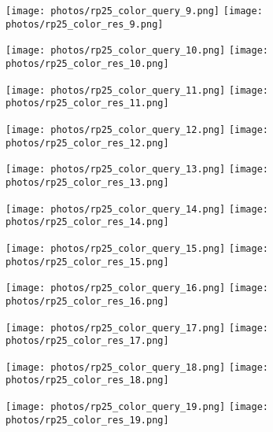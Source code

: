 \documentclass{article}
\begin{document}
\begin{figure}[!ht]
\centering
\texttt{[image: photos/rp25\_color\_query\_9.png]}
\texttt{[image: photos/rp25\_color\_res\_9.png]}
\end{figure}

\begin{figure}[!ht]
\centering
\texttt{[image: photos/rp25\_color\_query\_10.png]}
\texttt{[image: photos/rp25\_color\_res\_10.png]}
\end{figure}

\begin{figure}[!ht]
\centering
\texttt{[image: photos/rp25\_color\_query\_11.png]}
\texttt{[image: photos/rp25\_color\_res\_11.png]}
\end{figure}

\begin{figure}[!ht]
\centering
\texttt{[image: photos/rp25\_color\_query\_12.png]}
\texttt{[image: photos/rp25\_color\_res\_12.png]}
\end{figure}

\begin{figure}[!ht]
\centering
\texttt{[image: photos/rp25\_color\_query\_13.png]}
\texttt{[image: photos/rp25\_color\_res\_13.png]}
\end{figure}

\begin{figure}[!ht]
\centering
\texttt{[image: photos/rp25\_color\_query\_14.png]}
\texttt{[image: photos/rp25\_color\_res\_14.png]}
\end{figure}

\begin{figure}[!ht]
\centering
\texttt{[image: photos/rp25\_color\_query\_15.png]}
\texttt{[image: photos/rp25\_color\_res\_15.png]}
\end{figure}

\begin{figure}[!ht]
\centering
\texttt{[image: photos/rp25\_color\_query\_16.png]}
\texttt{[image: photos/rp25\_color\_res\_16.png]}
\end{figure}

\begin{figure}[!ht]
\centering
\texttt{[image: photos/rp25\_color\_query\_17.png]}
\texttt{[image: photos/rp25\_color\_res\_17.png]}
\end{figure}

\begin{figure}[!ht]
\centering
\texttt{[image: photos/rp25\_color\_query\_18.png]}
\texttt{[image: photos/rp25\_color\_res\_18.png]}
\end{figure}

\begin{figure}[!ht]
\centering
\texttt{[image: photos/rp25\_color\_query\_19.png]}
\texttt{[image: photos/rp25\_color\_res\_19.png]}
\end{figure}
\end{document}
